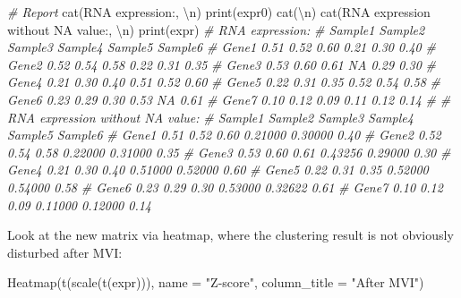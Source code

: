 \documentclass[
  12pt,
]{book}
\newenvironment{Shaded}{\begin{snugshade}}{\end{snugshade}}
\newcommand{\AttributeTok}[1]{\textcolor[rgb]{0.77,0.63,0.00}{#1}}
\newcommand{\CommentTok}[1]{\textcolor[rgb]{0.56,0.35,0.01}{\textit{#1}}}
\newcommand{\FunctionTok}[1]{\textcolor[rgb]{0.00,0.00,0.00}{#1}}
\newcommand{\NormalTok}[1]{#1}
\newcommand{\SpecialCharTok}[1]{\textcolor[rgb]{0.00,0.00,0.00}{#1}}
\newcommand{\StringTok}[1]{\textcolor[rgb]{0.31,0.60,0.02}{#1}}
\begin{document}
\begin{Shaded}
\begin{Highlighting}[]
\CommentTok{\# Report}
\FunctionTok{cat}\NormalTok{(}\StringTok{\textquotesingle{}RNA expression:\textquotesingle{}}\NormalTok{, }\StringTok{\textquotesingle{}}\SpecialCharTok{\textbackslash{}n}\StringTok{\textquotesingle{}}\NormalTok{)}
\FunctionTok{print}\NormalTok{(expr0)}
\FunctionTok{cat}\NormalTok{(}\StringTok{\textquotesingle{}}\SpecialCharTok{\textbackslash{}n}\StringTok{\textquotesingle{}}\NormalTok{)}
\FunctionTok{cat}\NormalTok{(}\StringTok{\textquotesingle{}RNA expression without NA value:\textquotesingle{}}\NormalTok{, }\StringTok{\textquotesingle{}}\SpecialCharTok{\textbackslash{}n}\StringTok{\textquotesingle{}}\NormalTok{)}
\FunctionTok{print}\NormalTok{(expr)}
\CommentTok{\# RNA expression: }
\CommentTok{\#       Sample1 Sample2 Sample3 Sample4 Sample5 Sample6}
\CommentTok{\# Gene1    0.51    0.52    0.60    0.21    0.30    0.40}
\CommentTok{\# Gene2    0.52    0.54    0.58    0.22    0.31    0.35}
\CommentTok{\# Gene3    0.53    0.60    0.61      NA    0.29    0.30}
\CommentTok{\# Gene4    0.21    0.30    0.40    0.51    0.52    0.60}
\CommentTok{\# Gene5    0.22    0.31    0.35    0.52    0.54    0.58}
\CommentTok{\# Gene6    0.23    0.29    0.30    0.53      NA    0.61}
\CommentTok{\# Gene7    0.10    0.12    0.09    0.11    0.12    0.14}
\CommentTok{\# }
\CommentTok{\# RNA expression without NA value: }
\CommentTok{\#       Sample1 Sample2 Sample3 Sample4 Sample5 Sample6}
\CommentTok{\# Gene1    0.51    0.52    0.60 0.21000 0.30000    0.40}
\CommentTok{\# Gene2    0.52    0.54    0.58 0.22000 0.31000    0.35}
\CommentTok{\# Gene3    0.53    0.60    0.61 0.43256 0.29000    0.30}
\CommentTok{\# Gene4    0.21    0.30    0.40 0.51000 0.52000    0.60}
\CommentTok{\# Gene5    0.22    0.31    0.35 0.52000 0.54000    0.58}
\CommentTok{\# Gene6    0.23    0.29    0.30 0.53000 0.32622    0.61}
\CommentTok{\# Gene7    0.10    0.12    0.09 0.11000 0.12000    0.14}
\end{Highlighting}
\end{Shaded}

Look at the new matrix via heatmap, where the clustering result is not obviously disturbed after MVI:

\begin{Shaded}
\begin{Highlighting}[]
\FunctionTok{Heatmap}\NormalTok{(}\FunctionTok{t}\NormalTok{(}\FunctionTok{scale}\NormalTok{(}\FunctionTok{t}\NormalTok{(expr))), }\AttributeTok{name =} \StringTok{"Z{-}score"}\NormalTok{, }\AttributeTok{column\_title =} \StringTok{"After MVI"}\NormalTok{)}
\end{Highlighting}
\end{Shaded}
\end{document}
